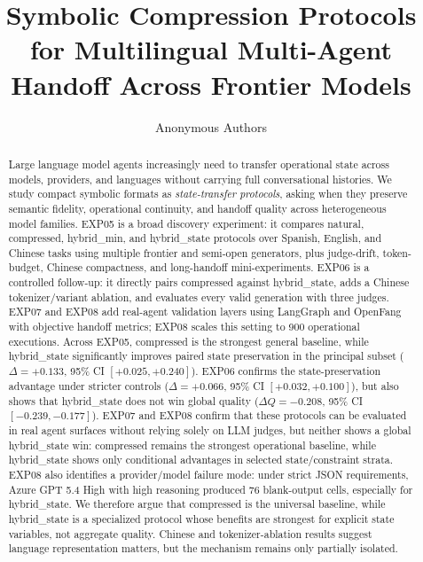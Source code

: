 \documentclass[11pt]{article}
\title{Symbolic Compression Protocols for Multilingual Multi-Agent Handoff Across Frontier Models}
\author{Anonymous Authors}
\date{}
\begin{document}
\maketitle

\begin{abstract}
Large language model agents increasingly need to transfer operational state across models, providers, and languages without carrying full conversational histories. We study compact symbolic formats as \emph{state-transfer protocols}, asking when they preserve semantic fidelity, operational continuity, and handoff quality across heterogeneous model families. EXP05 is a broad discovery experiment: it compares natural, compressed, hybrid\_min, and hybrid\_state protocols over Spanish, English, and Chinese tasks using multiple frontier and semi-open generators, plus judge-drift, token-budget, Chinese compactness, and long-handoff mini-experiments. EXP06 is a controlled follow-up: it directly pairs compressed against hybrid\_state, adds a Chinese tokenizer/variant ablation, and evaluates every valid generation with three judges. EXP07 and EXP08 add real-agent validation layers using LangGraph and OpenFang with objective handoff metrics; EXP08 scales this setting to 900 operational executions. Across EXP05, compressed is the strongest general baseline, while hybrid\_state significantly improves paired state preservation in the principal subset ($\Delta=+0.133$, 95\% CI $[+0.025,+0.240]$). EXP06 confirms the state-preservation advantage under stricter controls ($\Delta=+0.066$, 95\% CI $[+0.032,+0.100]$), but also shows that hybrid\_state does not win global quality ($\Delta Q=-0.208$, 95\% CI $[-0.239,-0.177]$). EXP07 and EXP08 confirm that these protocols can be evaluated in real agent surfaces without relying solely on LLM judges, but neither shows a global hybrid\_state win: compressed remains the strongest operational baseline, while hybrid\_state shows only conditional advantages in selected state/constraint strata. EXP08 also identifies a provider/model failure mode: under strict JSON requirements, Azure GPT 5.4 High with high reasoning produced 76 blank-output cells, especially for hybrid\_state. We therefore argue that compressed is the universal baseline, while hybrid\_state is a specialized protocol whose benefits are strongest for explicit state variables, not aggregate quality. Chinese and tokenizer-ablation results suggest language representation matters, but the mechanism remains only partially isolated.
\end{abstract}
\end{document}
